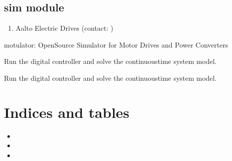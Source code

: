 \documentclass[letterpaper,10pt,english]{sphinxmanual}
\begin{document}
\section{sim module}
\label{\detokenize{sim:module-sim}}\label{\detokenize{sim:sim-module}}\label{\detokenize{sim::doc}}\begin{enumerate}
%
\setcounter{enumi}{2}
\item {} 
\sphinxAtStartPar
Aalto Electric Drives (contact: )

\end{enumerate}

\sphinxAtStartPar
motulator: Open\sphinxhyphen{}Source Simulator for Motor Drives and Power Converters

\begin{fulllineitems}
\label{\detokenize{sim:sim.sensored_ctrl}}
\pysigstartsignatures
{}
\pysigstopsignatures
\sphinxAtStartPar
Run the digital controller and solve the continuous\sphinxhyphen{}time system model.

\end{fulllineitems}


\begin{fulllineitems}
\label{\detokenize{sim:sim.sensorless_ctrl}}
\pysigstartsignatures
{}
\pysigstopsignatures
\sphinxAtStartPar
Run the digital controller and solve the continuous\sphinxhyphen{}time system model.

\end{fulllineitems}



\chapter{Indices and tables}
\label{\detokenize{index:indices-and-tables}}\begin{itemize}
\item {} 
\sphinxAtStartPar
{}

\item {} 
\sphinxAtStartPar
{}

\item {} 
\sphinxAtStartPar
{}

\end{itemize}
\end{document}
